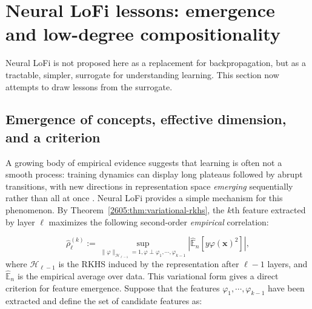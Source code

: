 \section{Neural LoFi lessons: emergence and low-degree compositionality}

\label{2605:sec:lofi-lessons}
Neural LoFi is not proposed here as a replacement for backpropagation, but as a tractable, simpler, surrogate for understanding learning. This section now attempts to draw lessons from the surrogate. 

\subsection{Emergence of concepts, effective dimension, and a criterion}
\label{2605:sec:emergence-snr}

A growing body of empirical evidence suggests that learning is often not a smooth process: training dynamics can display long plateaus followed by abrupt transitions, with new directions in representation space \emph{emerging} sequentially rather than all at once
\cite{wei2022emergent,raventos2023pretraining,arora2023theory,schaeffer2023are}.
Neural LoFi provides a simple mechanism for this phenomenon. By Theorem~\ref{2605:thm:variational-rkhs}, the $k$th feature extracted by layer $\ell$ maximizes the following second-order {\it empirical} correlation:

\begin{equation}
\widehat \rho_\ell^{(k)}
:=
\sup_{\|\varphi\|_{\mathcal H_{\ell-1}}=1, \varphi \perp \varphi_1,\cdots, \varphi_{k-1}}
\left|
\widehat{\mathbb E}_n
\left[
y \varphi(\bm x)^2
\right]
\right|,
\label{2605:eq:lofi-accessibility}
\end{equation}
where $\mathcal H_{\ell-1}$ is the RKHS induced by the representation after $\ell-1$ layers, and $\widehat{\mathbb E}_n$ is the empirical average over data. This variational form gives a direct criterion for feature emergence. Suppose that the features $\varphi_1,\cdots, \varphi_{k-1}$ have been extracted and define the set of candidate features as:

